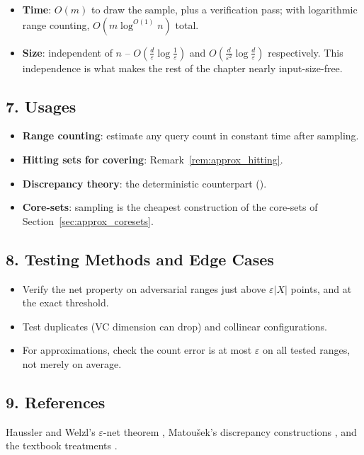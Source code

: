 \begin{itemize}
\item \textbf{Time}: $O(m)$ to draw the sample, plus a verification pass;
  with logarithmic range counting, $O(m \log^{O(1)} n)$ total.
\item \textbf{Size}: independent of $n$ -- $O(\frac{d}{\varepsilon}
  \log\frac{1}{\varepsilon})$ and $O(\frac{d}{\varepsilon^2}
  \log\frac{d}{\varepsilon})$ respectively. This independence is what makes
  the rest of the chapter nearly input-size-free.
\end{itemize}

\subsection{7. Usages}

\begin{itemize}
\item \textbf{Range counting}: estimate any query count in constant time
  after sampling.
\item \textbf{Hitting sets for covering}: Remark~\ref{rem:approx_hitting}.
\item \textbf{Discrepancy theory}: the deterministic counterpart
  (\cite{matousek1999}).
\item \textbf{Core-sets}: sampling is the cheapest construction of the
  core-sets of Section~\ref{sec:approx_coresets}.
\end{itemize}

\subsection{8. Testing Methods and Edge Cases}

\begin{itemize}
\item Verify the net property on adversarial ranges just above
  $\varepsilon |X|$ points, and at the exact threshold.
\item Test duplicates (VC dimension can drop) and collinear configurations.
\item For approximations, check the count error is at most $\varepsilon$
  on all tested ranges, not merely on average.
\end{itemize}

\subsection{9. References}

Haussler and Welzl's $\varepsilon$-net theorem \cite{hausslerwelzl1987},
Matou\v{s}ek's discrepancy constructions \cite{matousek1995,matousek1999},
and the textbook treatments \cite{deberg2008,harpeled2011}.


